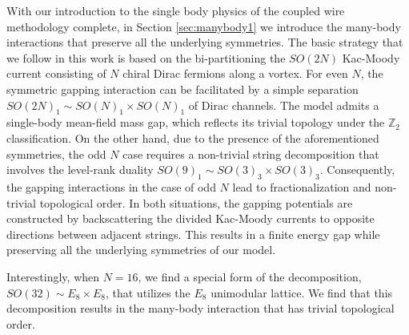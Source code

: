 With our introduction to the single body physics of the coupled wire methodology complete, in Section \ref{sec:manybody1} we introduce the many-body interactions that preserve all the underlying symmetries. The basic strategy that we follow in this work is based on the bi-partitioning the $SO(2N)$ Kac-Moody current consisting of $N$ chiral Dirac fermions along a vortex. For even $N$, the symmetric gapping interaction can be facilitated by a simple separation $SO(2N)_1\sim SO(N)_1\times SO(N)_1$ of Dirac channels. The model admits a single-body mean-field mass gap, which reflects its trivial topology under the $\mathbb{Z}_2$  classification. On the other hand, due to the presence of the aforementioned symmetries, the odd $N$ case requires a non-trivial string decomposition that involves the level-rank duality $SO(9)_1\sim SO(3)_3\times SO(3)_3$. Consequently, the gapping interactions in the case of odd $N$ lead to fractionalization and non-trivial topological order. In both situations, the gapping potentials are constructed by backscattering the divided Kac-Moody currents to opposite directions between adjacent strings. This results in a finite energy gap while preserving all the underlying symmetries of our model.

Interestingly, when $N=16$, we find a special form of the decomposition, $SO(32)\sim E_8 \times E_8$, that utilizes the $E_8$ unimodular lattice. We find that this decomposition results in the many-body interaction that has trivial topological order. 
